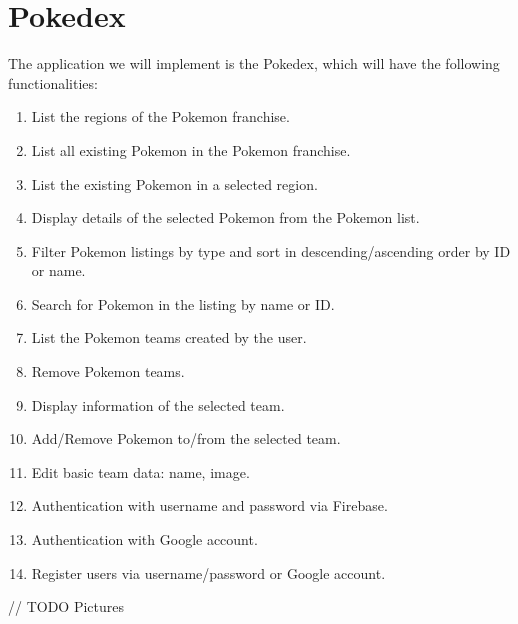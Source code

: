 \documentclass[a4paper, 12pt]{article}
\begin{document}
\section{Pokedex}

The application we will implement is the Pokedex, which will have the following functionalities:

\begin{enumerate}
    \item List the regions of the Pokemon franchise.

    \item List all existing Pokemon in the Pokemon franchise.
    
    \item List the existing Pokemon in a selected region.
    
    \item Display details of the selected Pokemon from the Pokemon list.
    
    \item Filter Pokemon listings by type and sort in descending/ascending order by ID or name.
    
    \item Search for Pokemon in the listing by name or ID.
    
    \item List the Pokemon teams created by the user.
    
    \item Remove Pokemon teams.
    
    \item Display information of the selected team.
    
    \item Add/Remove Pokemon to/from the selected team.
    
    \item Edit basic team data: name, image.
    
    \item Authentication with username and password via Firebase.
    
    \item Authentication with Google account.
    
    \item Register users via username/password or Google account.
\end{enumerate}


// TODO Pictures


\end{document}
